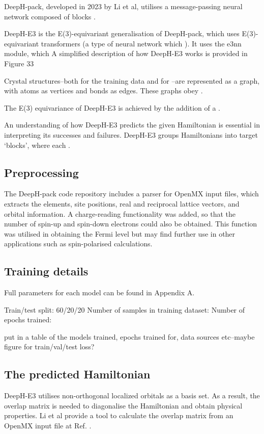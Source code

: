 \documentclass[11pt,a4paper,twoside]{report}  %
\numberwithin{equation}{section}					%
\numberwithin{figure}{section}						%
\newcommand{\red}[1]{{\color{red}#1}}
\begin{document}
DeepH-pack, developed in 2023 by Li et al, utilises a message-passing neural network composed of blocks .  

DeepH-E3 is the E(3)-equivariant generalisation of DeepH-pack, which uses E(3)-equivariant transformers (a type of neural network which ). It uses the e3nn module, which 
A simplified description of how DeepH-E3 works is provided in Figure 33

Crystal structures--both for the training data and for --are represented as a graph, with atoms as vertices and bonds as edges. These graphs obey . 

The E(3) equivariance of DeepH-E3 is achieved by the addition of a . 

An understanding of how DeepH-E3 predicts the given Hamiltonian is essential in interpreting its successes and failures. DeepH-E3 groups Hamiltonians into target `blocks', where each .

\subsection{Preprocessing}

The DeepH-pack code repository includes a parser for OpenMX input files, which extracts the elements, site positions, real and reciprocal lattice vectors, and orbital information. A charge-reading functionality was added, so that the number of spin-up and spin-down electrons could also be obtained. This function was utilised in obtaining the Fermi level but may find further use in other applications such as spin-polarised calculations.

\subsection{Training details}

Full parameters for each model can be found in Appendix A. 

Train/test split: 60/20/20
Number of samples in training dataset:
Number of epochs trained:



\red{put in a table of the models trained, epochs trained for, data sources etc--maybe figure for train/val/test loss?}

\subsection{The predicted Hamiltonian}

DeepH-E3 utilises non-orthogonal localized orbitals as a basis set. As a result, the overlap matrix is needed to diagonalise the Hamiltonian and obtain physical properties. Li et al provide a tool to calculate the overlap matrix from an OpenMX input file at Ref. \cite{}. 
\end{document}
